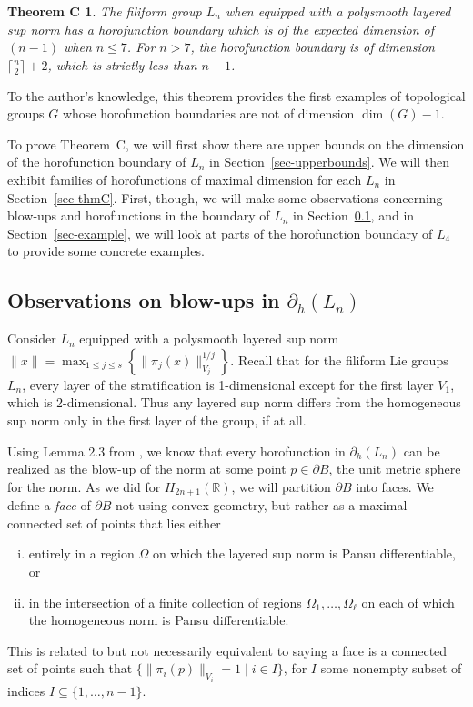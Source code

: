 \documentclass{article}
\newtheorem*{thmc}{Theorem C}{\bf}{\it}
\theoremstyle{definition}
\newcommand{\norm}[1]{\|#1\|}
\newcommand{\bhor}{\partial_h}
\newcommand{\HHR}{H_{2n+1}(\mathbb{R})}
\begin{document}
\begin{thmc}\label{thm-filiform}
The filiform group $L_n$ when equipped with a polysmooth layered sup norm has a horofunction boundary which is of the expected dimension of $(n-1)$ when $n \leq 7$. For $n>7$, the horofunction boundary is of dimension $\lceil\frac{ n }{2}\rceil + 2$, which is strictly less than $n-1$.
\end{thmc}

To the author's knowledge, this theorem provides the first examples of topological groups $G$ whose horofunction boundaries are not of dimension $\dim(G)-1$. 

To prove Theorem~C, we will first show there are upper bounds on the dimension of the horofunction boundary of $L_n$ in Section~\ref{sec-upperbounds}. We will then exhibit families of horofunctions of maximal dimension for each $L_n$ in Section~\ref{sec-thmC}. First, though, we will make some observations concerning blow-ups and horofunctions in the boundary of $L_n$ in Section~\ref{sec-observations}, and in Section~\ref{sec-example}, we will look at parts of the horofunction boundary of $L_4$ to provide some concrete examples.

\subsection{Observations on blow-ups in $\bhor(L_n)$}\label{sec-observations}

Consider $L_n$ equipped with a polysmooth layered sup norm
$\norm{x} = \max_{1\leq j \leq s} \left\{\norm{\pi_j(x)}_{V_j}^{1/j}\right \}$. Recall that for the filiform Lie groups $L_n$, every layer of the stratification is 1-dimensional except for the first layer $V_1$, which is 2-dimensional. Thus any layered sup norm differs from the homogeneous sup norm only in the first layer of the group, if at all.

Using Lemma 2.3 from \cite{FNG}, we know that every horofunction in $\bhor(L_n)$ can be realized as the blow-up of the norm at some point $p \in \partial B$, the unit metric sphere for the norm. As we did for $\HHR$, we will partition $\partial B$ into faces. We define a \emph{face} of $\partial B$ not using convex geometry, but rather as a maximal connected set of points that lies either 
 \begin{enumerate}[(i)]
 \item entirely in a region $\Omega$ on which the layered sup norm is Pansu differentiable, or
 \item in the intersection of a finite collection of regions $\Omega_1, \ldots, \Omega_\ell$ on each of which the homogeneous norm is Pansu differentiable.
  \end{enumerate}
This is related to but not necessarily equivalent to saying a face is a connected set of points such that $\{\norm{\pi_i(p)}_{V_i} = 1 \mid i \in I\}$, for $I$ some nonempty subset of indices $I \subseteq \{1, \ldots, n-1\}$.
\end{document}
